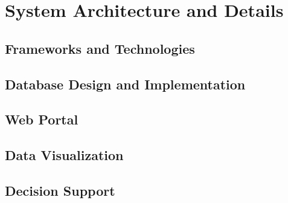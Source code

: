 \chapter{System Architecture and Details}
\label{ChapterFive}

\section{Frameworks and Technologies}
\label{FrameworksAndTechnologies}

\section{Database Design and Implementation}
\label{DatabaseDesignandImplementation}

\section{Web Portal}
\label{WebPrtal}

\section{Data Visualization}
\label{DataVisualization}

\section{Decision Support}
\label{DecisionSuport}